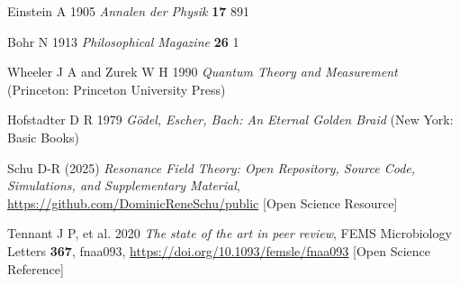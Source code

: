 \documentclass[12pt]{iopart}
\begin{document}
\begin{thebibliography}{99}
	
	Einstein A 1905 \textit{Annalen der Physik} \textbf{17} 891
	
	Bohr N 1913 \textit{Philosophical Magazine} \textbf{26} 1
	
	Wheeler J A and Zurek W H 1990 \textit{Quantum Theory and Measurement} (Princeton: Princeton University Press)
	
	Hofstadter D R 1979 \textit{G\"odel, Escher, Bach: An Eternal Golden Braid} (New York: Basic Books)
	
	Schu D-R (2025) \textit{Resonance Field Theory: Open Repository, Source Code, Simulations, and Supplementary Material}, \url{https://github.com/DominicReneSchu/public} [Open Science Resource]
	
	Tennant J P, et al. 2020 \textit{The state of the art in peer review}, FEMS Microbiology Letters \textbf{367}, fnaa093, \url{https://doi.org/10.1093/femsle/fnaa093} [Open Science Reference]
	
\end{thebibliography}
\end{document}
